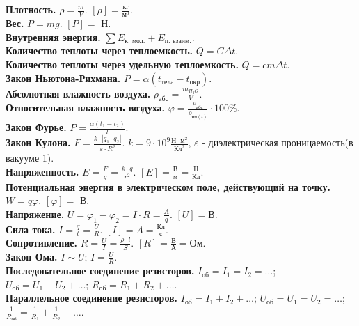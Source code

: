 \documentclass[12pt]{article}
\begin{document}
	\tableofcontents
	\setcounter{tocdepth}{3}
	\newpage
	\noindent
	\textbf{Плотность.} $\rho = \frac{m}{V}$. $[\rho] = \frac{\text{кг}}{\text{м}^3}$. \\
	\textbf{Вес.} $P = mg$. $[P] =$ Н. \\
	\textbf{Внутренняя энергия.} $\sum E_{\text{к. мол.}} + E_{\text{п. взаим.}}$. \\
	\textbf{Количество теплоты через теплоемкость.} $Q = C \varDelta t$. \\
	\textbf{Количество теплоты через удельную теплоемкость.} $Q = c m \varDelta t$. \\
	\textbf{Закон Ньютона-Рихмана.} $P = \alpha (t_{\text{тела}} - t_{\text{окр}})$. \\
	\textbf{Абсолютная влажность воздуха.} $\rho_{\text{абс}} = \frac{m_{H_2O}}{V}$. \\
	\textbf{Относительная влажность воздуха.} $\varphi = \frac{\rho_{\text{абс}}}{\rho_{\text{нп}(t)}} \cdot 100\%$. \\
	\textbf{Закон Фурье.} $P = \frac{\alpha (t_1 - t_2)}{l}$. \\
	\textbf{Закон Кулона.} $F = \frac{k \cdot |q_{1} \cdot q_{2}|}{\varepsilon \cdot R^{2}}$. $k = 9 \cdot 10^{9} \frac{\text{Н} \cdot \text{м}^{2}}{\text{Кл}^{2}}$, $\varepsilon$ - диэлектрическая проницаемость(в вакууме 1). \\
	\textbf{Напряженность.} $E = \frac{F}{q} = \frac{k \cdot q}{r^{2}}$. $[E] = \frac{\text{В}}{\text{м}} = \frac{\text{Н}}{\text{Кл}}$. \\
	\textbf{Потенциальная энергия в электрическом поле, действующий на точку.} $W = q \varphi$. $[\varphi] =$ В. \\
	\textbf{Напряжение.} $U = \varphi_{1} - \varphi_{2} = I \cdot R = \frac{A}{q}$. $[U] = \text{В}$. \\
	\textbf{Сила тока.} $I = \frac{q}{t} = \frac{U}{R}$. $[I] = A = \frac{\text{Кл}}{\text{с}}$. \\
	\textbf{Сопротивление.} $R = \frac{U}{I} = \frac{\rho \cdot l}{S}$. $[R] = \frac{\text{В}}{\text{А}} = \text{Ом}$. \\
	\textbf{Закон Ома.} $I \sim U$; $I = \frac{U}{R}$. \\
	\textbf{Последовательное соединение резисторов.} $I_{\text{об}} = I_{1} = I_{2} = \dots$; $U_{\text{об}} = U_{1} + U_{2} + \dots$; $R_{\text{об}} = R_{1} + R_{2} + \dots$. \\
	\textbf{Параллельное соединение резисторов.} $I_{\text{об}} = I_{1} + I_{2} + \dots$; $U_{\text{об}} = U_{1} = U_{2} = \dots$; $\frac{1}{R_{\text{об}}} = \frac{1}{R_{1}} + \frac{1}{R_{2}} + \dots$. \\
\end{document}
